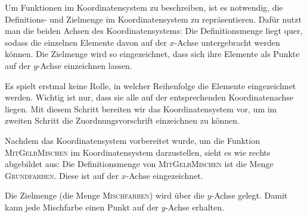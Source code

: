 \documentclass[../../main.tex]{subfiles}
\begin{document}
Um Funktionen im Koordinatensystem zu beschreiben, ist es notwendig, die Definitions- und Zielmenge im Koordinatensystem zu repräsentieren. Dafür nutzt man die beiden Achsen des Koordinatensystems: Die Definitionsmenge liegt quer, sodass die einzelnen Elemente davon auf der $x$-Achse untergebracht werden können. Die Zielmenge wird so eingezeichnet, dass sich ihre Elemente als Punkte auf der $y$-Achse einzeichnen lassen.

Es spielt erstmal keine Rolle, in welcher Reihenfolge die Elemente eingezeichnet werden. Wichtig ist nur, dass sie alle auf der entsprechenden Koordinatenachse liegen. Mit diesem Schritt bereiten wir das Koordinatensystem vor, um im zweiten Schritt die Zuordnungsvorschrift einzeichnen zu können.

\begin{example}{}
    Nachdem das Koordinatensystem vorbereitet wurde, um die Funktion \textsc{MitGelbMischen} im Koordinatensystem darzustellen, sieht es wie rechts abgebildet aus: Die Definitionsmenge von \textsc{MitGelbMischen} ist die Menge \textsc{Grundfarben}. Diese ist auf der $x$-Achse eingezeichnet.
    
    Die Zielmenge (die Menge \textsc{Mischfarben}) wird über die $y$-Achse gelegt. Damit kann jede Mischfarbe einen Punkt auf der $y$-Achse erhalten.
\end{example}
\end{document}
